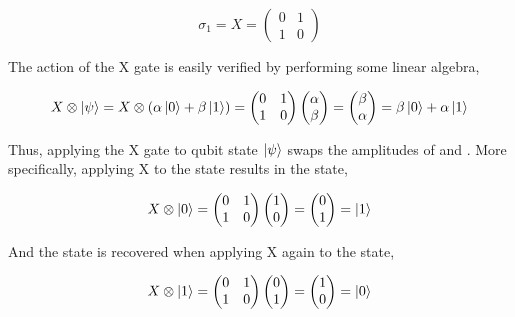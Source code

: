 \begin{equation}
\sigma_{1} = X = \begin{pmatrix}
 0 & 1 \\ 
 1 & 0
 \end{pmatrix}
\end{equation}

The action of the X gate is easily verified by performing some linear algebra,

\begin{equation}
\label{equ:xverification1}
X \otimes \ket{\psi} = X \otimes (\alpha \ket{0} + \beta \ket{1}) = \begin{pmatrix}
 0 & 1 \\ 
 1 & 0
 \end{pmatrix} \begin{pmatrix}
 \alpha  \\ 
 \beta
 \end{pmatrix} = \begin{pmatrix}
 \beta  \\ 
 \alpha
 \end{pmatrix} = \beta \ket{0} + \alpha \ket{1}
\end{equation}

Thus, applying the X gate to qubit state $\ket{\psi}$ swaps the amplitudes of \0 and \1. More specifically, applying X to the \0 state results in the \1 state,

\begin{equation}
\label{equ:xverification2}
X \otimes \ket{0} = \begin{pmatrix}
 0 & 1 \\ 
 1 & 0
 \end{pmatrix} \begin{pmatrix}
 1  \\ 
 0
 \end{pmatrix} = \begin{pmatrix}
 0  \\ 
 1 \end{pmatrix} =  \ket{1}
\end{equation}

And the \0 state is recovered when applying X again to the \1 state,

\begin{equation}
\label{equ:xverification3}
X \otimes \ket{1} = \begin{pmatrix}
 0 & 1 \\ 
 1 & 0
 \end{pmatrix} \begin{pmatrix}
 0  \\ 
 1
 \end{pmatrix} = \begin{pmatrix}
 1  \\ 
 0 \end{pmatrix} =  \ket{0}
\end{equation}

